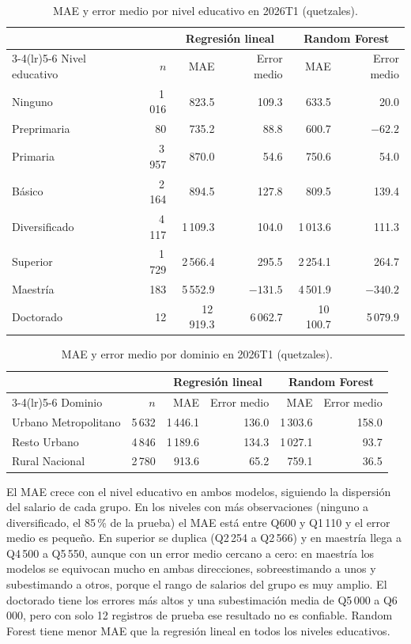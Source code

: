 \documentclass[11pt,a4paper]{article}
\begin{document}
\begin{table}[H]
\centering
\caption{MAE y error medio por nivel educativo en 2026T1 (quetzales).}
\label{tab:error_edu}
\small
\begin{tabular}{lrrrrr}
\toprule
 & & \multicolumn{2}{c}{Regresión lineal} & \multicolumn{2}{c}{Random Forest} \\
\cmidrule(lr){3-4}\cmidrule(lr){5-6}
Nivel educativo & $n$ & MAE & Error medio & MAE & Error medio \\
\midrule
Ninguno & 1\,016 & 823.5 & 109.3 & 633.5 & 20.0 \\
Preprimaria & 80 & 735.2 & 88.8 & 600.7 & $-62.2$ \\
Primaria & 3\,957 & 870.0 & 54.6 & 750.6 & 54.0 \\
Básico & 2\,164 & 894.5 & 127.8 & 809.5 & 139.4 \\
Diversificado & 4\,117 & 1\,109.3 & 104.0 & 1\,013.6 & 111.3 \\
Superior & 1\,729 & 2\,566.4 & 295.5 & 2\,254.1 & 264.7 \\
Maestría & 183 & 5\,552.9 & $-131.5$ & 4\,501.9 & $-340.2$ \\
Doctorado & 12 & 12\,919.3 & 6\,062.7 & 10\,100.7 & 5\,079.9 \\
\bottomrule
\end{tabular}
\end{table}

\begin{table}[H]
\centering
\caption{MAE y error medio por dominio en 2026T1 (quetzales).}
\label{tab:error_dom}
\small
\begin{tabular}{lrrrrr}
\toprule
 & & \multicolumn{2}{c}{Regresión lineal} & \multicolumn{2}{c}{Random Forest} \\
\cmidrule(lr){3-4}\cmidrule(lr){5-6}
Dominio & $n$ & MAE & Error medio & MAE & Error medio \\
\midrule
Urbano Metropolitano & 5\,632 & 1\,446.1 & 136.0 & 1\,303.6 & 158.0 \\
Resto Urbano & 4\,846 & 1\,189.6 & 134.3 & 1\,027.1 & 93.7 \\
Rural Nacional & 2\,780 & 913.6 & 65.2 & 759.1 & 36.5 \\
\bottomrule
\end{tabular}
\end{table}

El MAE crece con el nivel educativo en ambos modelos, siguiendo la dispersión del salario de cada grupo. En los niveles con más observaciones (ninguno a diversificado, el 85\,\% de la prueba) el MAE está entre Q600 y Q1\,110 y el error medio es pequeño. En superior se duplica (Q2\,254 a Q2\,566) y en maestría llega a Q4\,500 a Q5\,550, aunque con un error medio cercano a cero: en maestría los modelos se equivocan mucho en ambas direcciones, sobreestimando a unos y subestimando a otros, porque el rango de salarios del grupo es muy amplio. El doctorado tiene los errores más altos y una subestimación media de Q5\,000 a Q6\,000, pero con solo 12 registros de prueba ese resultado no es confiable. Random Forest tiene menor MAE que la regresión lineal en todos los niveles educativos.
\end{document}
